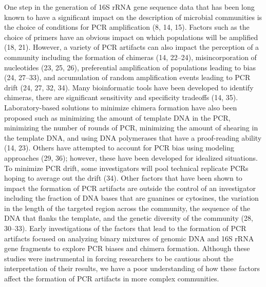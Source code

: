 \documentclass[11pt,]{article}
\begin{document}
One step in the generation of 16S rRNA gene sequence data that has been
long known to have a significant impact on the description of microbial
communities is the choice of conditions for PCR amplification (8, 14,
15). Factors such as the choice of primers have an obvious impact on
which populations will be amplified (18, 21). However, a variety of PCR
artifacts can also impact the perception of a community including the
formation of chimeras (14, 22--24), misincorporation of nucleotides (23,
25, 26), preferential amplification of populations leading to bias (24,
27--33), and accumulation of random amplification events leading to PCR
drift (24, 27, 32, 34). Many bioinformatic tools have been developed to
identify chimeras, there are significant sensitivity and specificity
tradeoffs (14, 35). Laboratory-based solutions to minimize chimera
formation have also been proposed such as minimizing the amount of
template DNA in the PCR, minimizing the number of rounds of PCR,
minimizing the amount of shearing in the template DNA, and using DNA
polymerases that have a proof-reading ability (14, 23). Others have
attempted to account for PCR bias using modeling approaches (29, 36);
however, these have been developed for idealized situations. To minimize
PCR drift, some investigators will pool technical replicate PCRs hoping
to average out the drift (34). Other factors that have been shown to
impact the formation of PCR artifacts are outside the control of an
investigator including the fraction of DNA bases that are guanines or
cytosines, the variation in the length of the targeted region across the
community, the sequence of the DNA that flanks the template, and the
genetic diversity of the community (28, 30--33). Early investigations of
the factors that lead to the formation of PCR artifacts focused on
analyzing binary mixtures of genomic DNA and 16S rRNA gene fragments to
explore PCR biases and chimera formation. Although these studies were
instrumental in forcing researchers to be cautious about the
interpretation of their results, we have a poor understanding of how
these factors affect the formation of PCR artifacts in more complex
communities.
\end{document}
